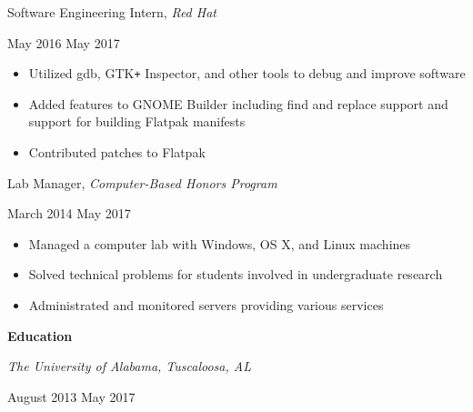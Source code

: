 \documentclass[11pt]{article}
\begin{document}
\begin{minipage}[t]{0.65\textwidth}
\flushleft
Software Engineering Intern, \textit{Red Hat}\\
\end{minipage}
\begin{minipage}[t]{0.30\textwidth}
\flushright
May 2016 \space \textemdash \space May 2017\\
\end{minipage}

\begin{itemize}
  \item Utilized gdb, GTK\texttt{+} Inspector, and other tools to debug and improve software
  \item Added features to GNOME Builder including find and replace support and support for building Flatpak manifests
  \item Contributed patches to Flatpak
\end{itemize}

\begin{minipage}[t]{0.65\textwidth}
\flushleft
Lab Manager, \textit{Computer-Based Honors Program}\\
\end{minipage}
\begin{minipage}[t]{0.30\textwidth}
\flushright
March 2014 \space \textemdash \space May 2017\\
\end{minipage}

\begin{itemize}
  \item Managed a computer lab with Windows, OS X, and Linux machines
  \item Solved technical problems for students involved in undergraduate research
  \item Administrated and monitored servers providing various services
\end{itemize}

\newpage

\vspace{0.8em}
\hbox{\large \textbf{Education}}

\begin{minipage}[t]{0.65\textwidth}
\flushleft
\textit{The University of Alabama, Tuscaloosa, AL}\\
\end{minipage}
\begin{minipage}[t]{0.30\textwidth}
\flushright
August 2013 \space \textemdash \space May 2017\\
\end{minipage}
\end{document}
